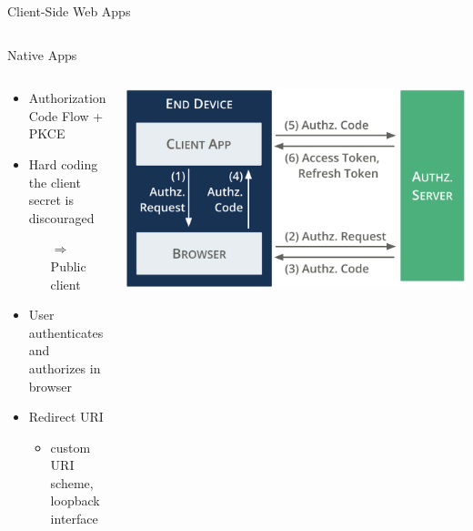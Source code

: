 \documentclass[aspectratio=169]{beamer}
\begin{document}
\begin{frame}{Client-Side Web Apps \hfill {\large{}}}
\begin{columns}
\begin{column}{0.45\textwidth}
		\end{column}
	\end{columns}
	\vspace*{1em}
\end{frame}

\begin{frame}{Native Apps \hfill {\large{}}}
	\begin{columns}
		\begin{column}{0.5\textwidth}
			\begin{itemize}
				\item Authorization Code Flow + PKCE
				\item Hard coding the client secret is discouraged 
				\begin{itemize}
					\item[$\Rightarrow$] Public client
				\end{itemize}
				\item User authenticates and authorizes in browser
				\item Redirect URI
				\begin{itemize}
					\item \eg custom URI scheme, loopback interface
				\end{itemize}
			\end{itemize}
		\end{column}
		\begin{column}{0.5\textwidth}
			\vspace*{0.5em}
			\includegraphics[width=1\textwidth]{figures/authorization-flow-native-apps}
		\end{column}
	\end{columns}
	\vspace*{1em}
\end{frame}
\end{document}
